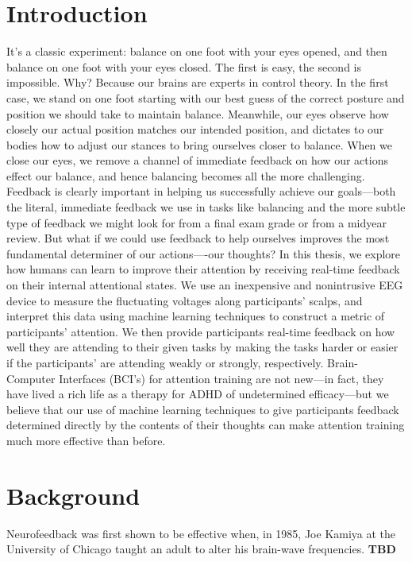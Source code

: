\documentclass[11pt]{report}
\begin{document}
\section{Introduction}
It’s a classic experiment: balance on one foot with your eyes opened, and then balance on one foot with your eyes closed.  The first is easy, the second is impossible.  Why?  Because our brains are experts in control theory.  In the first case, we stand on one foot starting with our best guess of the correct posture and position we should take to maintain balance.  Meanwhile, our eyes observe how closely our actual position matches our intended position, and dictates to our bodies how to adjust our stances to bring ourselves closer to balance.  When we close our eyes, we remove a channel of immediate feedback on how our actions effect our balance, and hence balancing becomes all the more challenging.
Feedback is clearly important in helping us successfully achieve our goals—both the literal, immediate feedback we use in tasks like balancing and the more subtle type of feedback we might look for from a final exam grade or from a midyear review.  But what if we could use feedback to help ourselves improves the most fundamental determiner of our actions—-our thoughts?  In this thesis, we explore how humans can learn to improve their attention by receiving real-time feedback on their internal attentional states.  We use an inexpensive and nonintrusive EEG device to measure the fluctuating voltages along participants’ scalps, and interpret this data using machine learning techniques to construct a metric of participants’ attention.  We then provide participants real-time feedback on how well they are attending to their given tasks by making the tasks harder or easier if the participants’ are attending weakly or strongly, respectively.  Brain-Computer Interfaces (BCI’s) for attention training are not new—in fact, they have lived a rich life as a therapy for ADHD of undetermined efficacy—but we believe that our use of machine learning techniques to give participants feedback determined directly by the contents of their thoughts can make attention training much more effective than before. 

\section{Background}

Neurofeedback was first shown to be effective when, in 1985, Joe Kamiya at the University of Chicago taught an adult to alter his brain-wave frequencies\cite{Lofthouse}. {\bf TBD}
\end{document}
